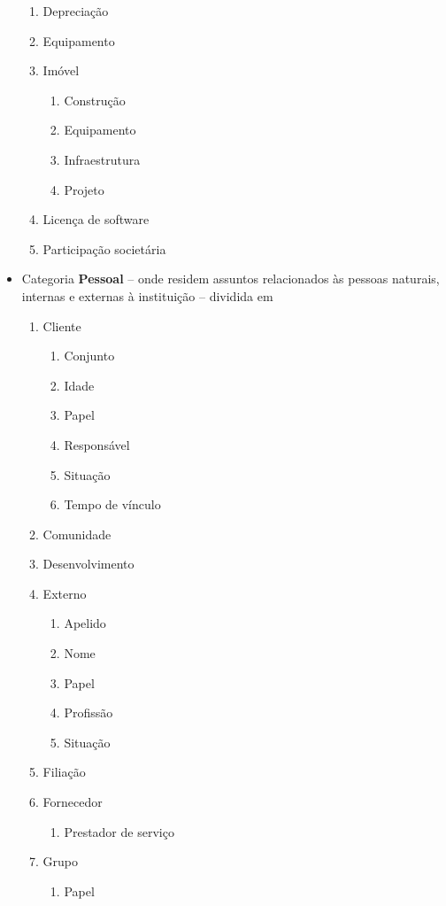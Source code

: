 \begin{multicols}{2}
\begin{itemize}
\begin{enumerate}
			\item Depreciação				
			\item Equipamento				
			\item Imóvel	\begin{enumerate}			
					\item Construção		
					\item Equipamento		
					\item Infraestrutura		
					\item Projeto	\end{enumerate}	
			\item Licença de software				
			\item Participação societária				
\end{enumerate}	\item Categoria \textbf{Pessoal} -- onde residem assuntos relacionados às pessoas naturais, internas e externas à instituição -- dividida em	\begin{enumerate} 	\item Cliente	\begin{enumerate}			
					\item Conjunto		
					\item Idade		
					\item Papel		
					\item Responsável		
					\item Situação		
					\item Tempo de vínculo	\end{enumerate}	
			\item Comunidade				
			\item Desenvolvimento				
			\item Externo	\begin{enumerate}			
					\item Apelido		
					\item Nome		
					\item Papel		
					\item Profissão		
					\item Situação	\end{enumerate}	
			\item Filiação				
			\item Fornecedor	\begin{enumerate}	\item Prestador de serviço	\end{enumerate}	
			\item Grupo	\begin{enumerate}			
					\item Papel	\end{enumerate}	

\end{enumerate}
\end{itemize}
\end{multicols}
